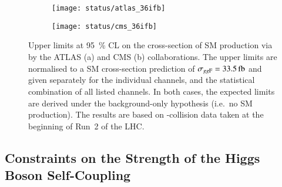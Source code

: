 \begin{figure}[htbp]
  \centering

  \begin{subfigure}[b]{0.48\textwidth}
    \centering

    \texttt{[image: status/atlas\_36ifb]}

  \end{subfigure}\hfill%
  \begin{subfigure}[b]{0.48\textwidth}
    \centering

    \texttt{[image: status/cms\_36ifb]}

  \end{subfigure}

  \caption{Upper limits at \SI{95}{\percent} CL on the cross-section of SM \HH
    production via \ggF by the ATLAS (a) and CMS (b) collaborations. The upper
    limits are normalised to a SM cross-section prediction of
    $\sigma_{\ggF} = \SI{33.5}{\femto\barn}$ and given separately for the
    individual channels, and the statistical combination of all listed
    channels. In both cases, the expected limits are derived under the
    background-only hypothesis (i.e.\ no SM \HH production). The results are
    based on \pp-collision data taken at the beginning of Run~2 of the LHC.}%
  \label{fig:prior_status_smhh}
\end{figure}


\subsection{Constraints on the Strength of the Higgs Boson Self-Coupling}%
\label{sec:past_results_klambda}


